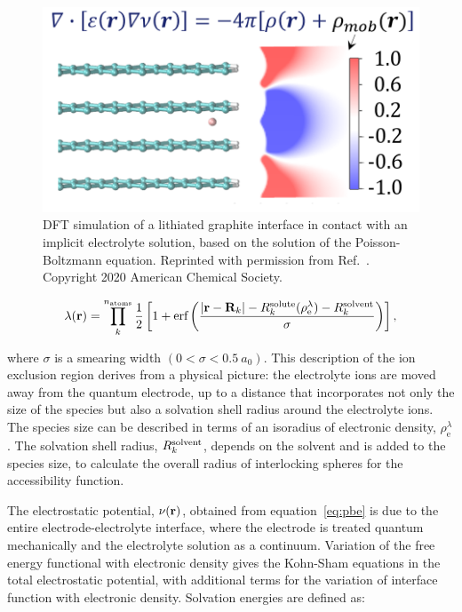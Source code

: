\documentclass[../main.tex]{subfiles}
\begin{document}
\begin{figure}
    \centering
    \includegraphics[scale=0.7]{figures/DFT+Continuum.png}
    \caption{DFT simulation of a lithiated graphite interface in contact with an implicit electrolyte solution, based on the solution of the Poisson-Boltzmann equation. Reprinted with permission from Ref.~. Copyright 2020 American Chemical Society.}
    \label{fig:DFT+continuum}
\end{figure}

\begin{equation}
    \label{eq:access}
    \lambda\!\left(\mathbf{r}\right) = \prod\limits_{k}^{n_\textrm{atoms}}\frac{1}{2} \left[1+\textrm{erf}\left(\frac{|\textbf{r}-\textbf{R}_k|-R^{\rm solute}_k(\rho_{\textrm{e}}^\lambda)-R^{\rm solvent}_k}{\sigma}\right)\right],
\end{equation}

where $\sigma$ is a smearing width $(0<\sigma<0.5~a_0)$. This description of the ion exclusion region derives from a physical picture: the electrolyte ions are moved away from the quantum electrode, up to a distance that incorporates not only the size of the species but also a solvation shell radius around the electrolyte ions. The species size can be described in terms of an isoradius of electronic density, $\rho_{\textrm{e}}^\lambda$. The solvation shell radius, $R^{\rm solvent}_k$, depends on the solvent and is added to the species size, to calculate the overall radius of interlocking spheres for the accessibility function.

The electrostatic potential, $\nu\!\left(\mathbf{r}\right)$, obtained from equation~\ref{eq:pbe} is due to the entire electrode-electrolyte interface, where the electrode is treated quantum mechanically and the electrolyte solution as a continuum. Variation of the free energy functional with electronic density gives the Kohn-Sham equations in the total electrostatic potential, with additional terms for the variation of interface function with electronic density.\cite{Dziedzic2011, Ringe2016} Solvation energies are defined as:\cite{Ringe2016, Stein2019}
\end{document}
